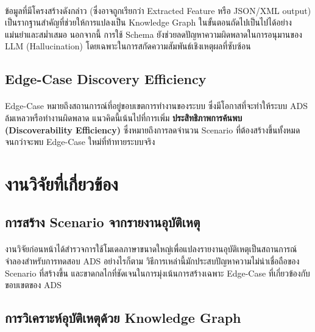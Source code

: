 \paragraph{}
ข้อมูลที่มีโครงสร้างดังกล่าว (ซึ่งอาจถูกเรียกว่า Extracted Feature หรือ JSON/XML output) เป็นรากฐานสำคัญที่ช่วยให้การแปลงเป็น Knowledge Graph ในขั้นตอนถัดไปเป็นไปได้อย่างแม่นยำและสม่ำเสมอ นอกจากนี้ การใช้ Schema ยังช่วยลดปัญหาความผิดพลาดในการอนุมานของ LLM (Hallucination) โดยเฉพาะในการสกัดความสัมพันธ์เชิงเหตุผลที่ซับซ้อน

\subsection{Edge-Case Discovery Efficiency}\paragraph{}

Edge-Case หมายถึงสถานการณ์ที่อยู่ขอบเขตการทำงานของระบบ ซึ่งมีโอกาสที่จะทำให้ระบบ ADS ล้มเหลวหรือทำงานผิดพลาด แนวคิดนี้เน้นไปที่การเพิ่ม \textbf{ประสิทธิภาพการค้นพบ (Discoverability Efficiency)} ซึ่งหมายถึงการลดจำนวน Scenario ที่ต้องสร้างขึ้นทั้งหมดจนกว่าจะพบ Edge-Case ใหม่ที่ท้าทายระบบจริง

\section{งานวิจัยที่เกี่ยวข้อง}

\subsection{การสร้าง Scenario จากรายงานอุบัติเหตุ}\paragraph{}

งานวิจัยก่อนหน้าได้สำรวจการใช้โมเดลภาษาขนาดใหญ่เพื่อแปลงรายงานอุบัติเหตุเป็นสถานการณ์จำลองสำหรับการทดสอบ ADS \cite{khot2024prompting} อย่างไรก็ตาม วิธีการเหล่านี้มักประสบปัญหาความไม่น่าเชื่อถือของ Scenario ที่สร้างขึ้น และขาดกลไกที่ชัดเจนในการมุ่งเน้นการสร้างเฉพาะ Edge-Case ที่เกี่ยวข้องกับขอบเขตของ ADS

\subsection{การวิเคราะห์อุบัติเหตุด้วย Knowledge Graph}\paragraph{}

